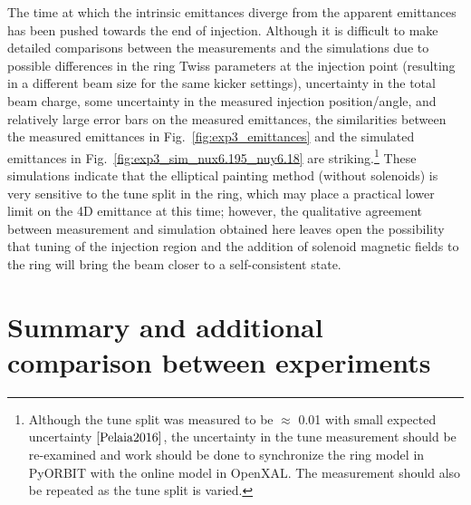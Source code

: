 The time at which the intrinsic emittances diverge from the apparent emittances has been pushed towards the end of injection. Although it is difficult to make detailed comparisons between the measurements and the simulations due to possible differences in the ring Twiss parameters at the injection point (resulting in a different beam size for the same kicker settings), uncertainty in the total beam charge, some uncertainty in the measured injection position/angle, and relatively large error bars on the measured emittances, the similarities between the measured emittances in Fig.~\ref{fig:exp3_emittances} and the simulated emittances in Fig.~\ref{fig:exp3_sim_nux6.195_nuy6.18} are striking.\footnote{Although the tune split was measured to be $\approx$ 0.01 with small expected uncertainty $\cite{Pelaia2016}$, the uncertainty in the tune measurement should be re-examined and work should be done to synchronize the ring model in PyORBIT with the online model in OpenXAL. The measurement should also be repeated as the tune split is varied.} These simulations indicate that the elliptical painting method (without solenoids) is very sensitive to the tune split in the ring, which may place a practical lower limit on the 4D emittance at this time; however, the qualitative agreement between measurement and simulation obtained here leaves open the possibility that tuning of the injection region and the addition of solenoid magnetic fields to the ring will bring the beam closer to a self-consistent state.



\section{Summary and additional comparison between experiments}


